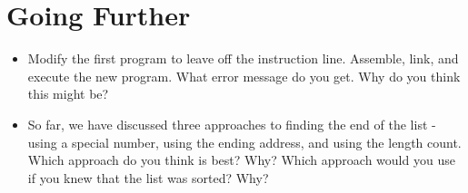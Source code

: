 \section{Going Further}

\begin{itemize}\item Modify the first program to leave off the  instruction line. Assemble, link, and execute the new program.  What error message do you get.  Why do you think this might be? 
\item So far, we have discussed three approaches to finding the end of the list - using a special number, using the ending address, and using the length count.  Which approach do you think is best?  Why?  Which approach would you use if you knew that the list was sorted?  Why? 
\end{itemize} 

